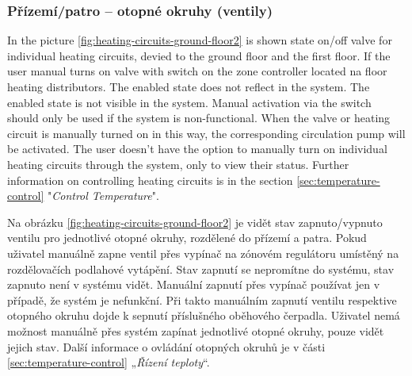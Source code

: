\begin{Czech}
\subsubsection{Přízemí/patro – otopné okruhy (ventily)}
\end{Czech}


\begin{English}
In the picture \ref{fig:heating-circuits-ground-floor2}  is shown state on/off valve for individual heating circuits, devied to the ground floor and the first floor. If the user  manual turns on valve with switch on the zone controller located na floor heating  distributors. The enabled state does not reflect in the system. The enabled state is not visible in the system. Manual activation via the switch should only be used if the system is non-functional. When the valve or heating circuit is manually turned on in this way, the corresponding circulation pump will be activated. The user doesn't have the option to manually turn on individual heating circuits through the system, only to view their status. Further information on controlling heating circuits is in the section \ref{sec:temperature-control} "\textit{Control Temperature}".
\end{English}

\begin{Czech}
Na obrázku \ref{fig:heating-circuits-ground-floor2} je vidět stav zapnuto/vypnuto ventilu pro jednotlivé otopné okruhy, rozdělené do přízemí a patra. Pokud uživatel manuálně zapne ventil přes vypínač na zónovém regulátoru umístěný na rozdělovačích podlahové vytápění. Stav zapnutí se nepromítne do systému, stav zapnuto není v systému vidět. Manuální zapnutí přes vypínač používat jen v případě, že systém je nefunkční. Při takto manuálním zapnutí ventilu respektive otopného okruhu dojde k sepnutí příslušného oběhového čerpadla. Uživatel nemá možnost manuálně přes systém zapínat jednotlivé otopné okruhy, pouze vidět jejich stav. Další informace o ovládání otopných okruhů je v části \ref{sec:temperature-control} „\textit{Řízení teploty}“.
\end{Czech}


